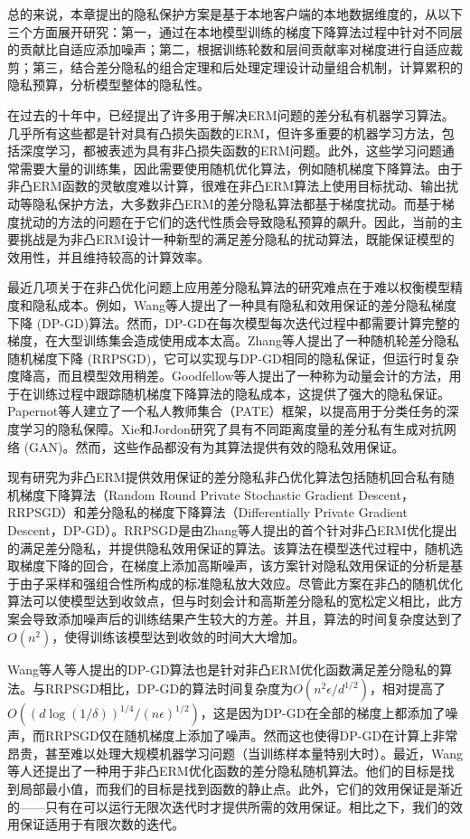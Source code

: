 总的来说，本章提出的隐私保护方案是基于本地客户端的本地数据维度的，从以下三个方面展开研究：第一，通过在本地模型训练的梯度下降算法过程中针对不同层的贡献比自适应添加噪声；第二，根据训练轮数和层间贡献率对梯度进行自适应裁剪；第三，结合差分隐私的组合定理和后处理定理设计动量组合机制，计算累积的隐私预算，分析模型整体的隐私性。

在过去的十年中，已经提出了许多用于解决ERM问题的差分私有机器学习算法。几乎所有这些都是针对具有凸损失函数的ERM，但许多重要的机器学习方法，包括深度学习，都被表述为具有非凸损失函数的ERM问题。此外，这些学习问题通常需要大量的训练集，因此需要使用随机优化算法，例如随机梯度下降算法。由于非凸ERM函数的灵敏度难以计算，很难在非凸ERM算法上使用目标扰动、输出扰动等隐私保护方法，大多数非凸ERM的差分隐私算法都基于梯度扰动。而基于梯度扰动的方法的问题在于它们的迭代性质会导致隐私预算的飙升。因此，当前的主要挑战是为非凸ERM设计一种新型的满足差分隐私的扰动算法，既能保证模型的效用性，并且维持较高的计算效率。

最近几项关于在非凸优化问题上应用差分隐私算法的研究难点在于难以权衡模型精度和隐私成本。例如，Wang等人提出了一种具有隐私和效用保证的差分隐私梯度下降 (DP-GD)算法。然而，DP-GD在每次模型每次迭代过程中都需要计算完整的梯度，在大型训练集会造成使用成本太高。Zhang等人提出了一种随机轮差分隐私随机梯度下降 (RRPSGD)，它可以实现与DP-GD相同的隐私保证，但运行时复杂度降高，而且模型效用稍差。Goodfellow等人提出了一种称为动量会计的方法，用于在训练过程中跟踪随机梯度下降算法的隐私成本，这提供了强大的隐私保证。 Papernot等人建立了一个私人教师集合（PATE）框架，以提高用于分类任务的深度学习的隐私保障。Xie和Jordon研究了具有不同距离度量的差分私有生成对抗网络 (GAN)。然而，这些作品都没有为其算法提供有效的隐私效用保证。

现有研究为非凸ERM提供效用保证的差分隐私非凸优化算法包括随机回合私有随机梯度下降算法（Random Round Private Stochastic Gradient
Descent，RRPSGD）和差分隐私的梯度下降算法（Differentially Private Gradient Descent，DP-GD）。RRPSGD是由Zhang等人提出的首个针对非凸ERM优化提出的满足差分隐私，并提供隐私效用保证的算法。该算法在模型迭代过程中，随机选取梯度下降的回合，在梯度上添加高斯噪声，该方案针对隐私效用保证的分析是基于由子采样和强组合性所构成的标准隐私放大效应。尽管此方案在非凸的随机优化算法可以使模型达到收敛点，但与时刻会计和高斯差分隐私的宽松定义相比，此方案会导致添加噪声后的训练结果产生较大的方差。并且，算法的时间复杂度达到了$O\left(n^{2}\right)$，使得训练该模型达到收敛的时间大大增加。

Wang等人等人提出的DP-GD算法也是针对非凸ERM优化函数满足差分隐私的算法。与RRPSGD相比，DP-GD的算法时间复杂度为$O\left(n^{2} \epsilon / d^{1 / 2}\right)$，相对提高了$O\left((d \log (1 / \delta))^{1 / 4} /(n \epsilon)^{1 / 2}\right)$，这是因为DP-GD在全部的梯度上都添加了噪声，而RRPSGD仅在随机梯度上添加了噪声。然而这也使得DP-GD在计算上非常昂贵，甚至难以处理大规模机器学习问题（当训练样本量特别大时）。最近，Wang等人还提出了一种用于非凸ERM优化函数的差分隐私随机算法。他们的目标是找到局部最小值，而我们的目标是找到函数的静止点。此外，它们的效用保证是渐近的——只有在可以运行无限次迭代时才提供所需的效用保证。相比之下，我们的效用保证适用于有限次数的迭代。

